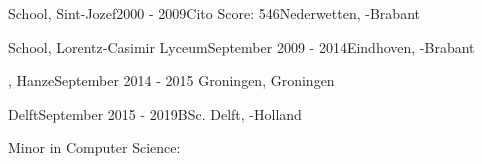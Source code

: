 \begin{rSection}{}
  \begin{experienceItem}
    { School, Sint-Jozef}{2000 - 2009}{Cito Score: 546}{Nederwetten, -Brabant}
  \end{experienceItem}

  \begin{experienceItem}
    { School, Lorentz-Casimir Lyceum}{September 2009 -  2014}{}{Eindhoven, -Brabant}
  \end{experienceItem}

  \begin{experienceItem}
    {, Hanze}{September 2014 -  2015} { }{Groningen, Groningen}
  \end{experienceItem}

  \begin{experienceItem}
    { Delft}{September 2015 -  2019}{BSc. }{Delft, -Holland}
  \end{experienceItem}

  \begin{experienceItem}
    {}{}{ Minor in Computer Science:}{}
  \end{experienceItem}


\end{rSection}
